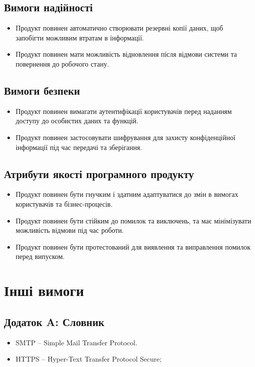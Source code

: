 \documentclass[14pt]{extreport}
\begin{document}
\begin{normalsize}
	\subsection*{Вимоги надійності}
	\begin{itemize}
		\item Продукт повинен автоматично створювати резервні копії даних, щоб запобігти можливим втратам в інформації.
		\item Продукт повинен мати можливість відновлення після відмови системи та повернення до робочого стану.
	\end{itemize}
	
	\subsection*{Вимоги безпеки}
	\begin{itemize}
		\item Продукт повинен вимагати аутентифікації користувачів перед наданням доступу до особистих даних та функцій.
		\item Продукт повинен застосовувати шифрування для захисту конфіденційної інформації під час передачі та зберігання.
	\end{itemize}
	
	\subsection*{Атрибути якості програмного продукту}
	\begin{itemize}
		\item Продукт повинен бути гнучким і здатним адаптуватися до змін в вимогах користувачів та бізнес-процесів.
		\item Продукт повинен бути стійким до помилок та виключень, та має мінімізувати можливість відмови під час роботи.
		\item Продукт повинен бути протестований для виявлення та виправлення помилок перед випуском.
	\end{itemize}
	
	\section*{Інші вимоги}
	\subsection*{Додаток A: Словник}
	\begin{itemize}
		\item SMTP – Simple Mail Transfer Protocol.
		\item HTTPS – Hyper-Text Transfer Protocol Secure;
	\end{itemize}


\end{normalsize}
\end{document}
